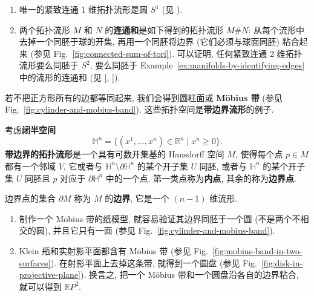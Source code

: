 \begin{RiemannRemark}\label{rem:connected-sums-of-surfaces}
\begin{enumerate}[label=(\arabic*),leftmargin=*]
\item 唯一的紧致连通 1 维拓扑流形是圆 $S^1$ (见 ).
\item 两个拓扑流形 $M$ 和 $N$ 的\textbf{连通和}是如下得到的拓扑流形 $M\#N$: 从每个流形中去掉一个同胚于球的开集, 再用一个同胚将边界 (它们必须与球面同胚) 粘合起来 (参见 Fig.~\ref{fig:connected-sum-of-tori}). 可以证明, 任何紧致连通 2 维拓扑流形要么同胚于 $S^2$, 要么同胚于 Example~\ref{ex:manifolds-by-identifying-edges} 中的流形的连通和 (见 [, ]).
\end{enumerate}
\end{RiemannRemark}


若不把正方形所有的边都等同起来, 我们会得到圆柱面或 \textbf{Möbius 带} (参见 Fig.~\ref{fig:cylinder-and-mobius-band}). 这些拓扑空间是\textbf{带边界流形}的例子.

\begin{RiemannDefinition}\label{def:topological-manifold-with-boundary}
考虑\textbf{闭半空间}
\[
  \mathbb{H}^n=\{(x^1,\ldots,x^n)\in\mathbb{R}^n\mid x^n\geq 0\}.
\]
\textbf{带边界的拓扑流形}是一个具有可数开集基的 Hausdorff 空间 $M$, 使得每个点 $p\in M$ 都有一个邻域 $V$, 它或者与 $\mathbb{H}^n\setminus\partial\mathbb{H}^n$ 的某个开子集 $U$ 同胚, 或者与 $\mathbb{H}^n$ 的某个开子集 $U$ 同胚且 $p$ 对应于 $\partial\mathbb{H}^n$ 中的一个点. 第一类点称为\textbf{内点}, 其余的称为\textbf{边界点}.
\end{RiemannDefinition}


边界点的集合 $\partial M$ 称为 $M$ 的\textbf{边界}, 它是一个 $(n-1)$ 维流形.

\begin{RiemannRemark}\label{rem:mobius-band-decompositions}
\begin{enumerate}[label=\arabic*.,leftmargin=*]
\item 制作一个 Möbius 带的纸模型, 就容易验证其边界同胚于一个圆 (不是两个不相交的圆), 并且它只有一面 (参见 Fig.~\ref{fig:cylinder-and-mobius-band}).
\item Klein 瓶和实射影平面都含有 Möbius 带 (参见 Fig.~\ref{fig:mobius-band-in-two-surfaces}). 在射影平面上去掉这条带, 就得到一个圆盘 (参见 Fig.~\ref{fig:disk-in-projective-plane}). 换言之, 把一个 Möbius 带和一个圆盘沿各自的边界粘合, 就可以得到 $\mathbb{R}P^2$.
\end{enumerate}
\end{RiemannRemark}

